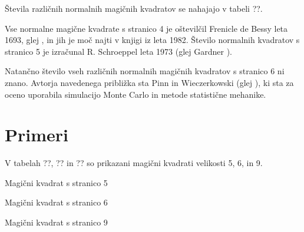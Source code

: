 \documentclass[a4paper,12pt]{article}
\begin{document}
Števila različnih normalnih magičnih kvadratov se nahajajo v tabeli ??.

Vse normalne magične kvadrate s stranico 4 je oštevilčil Frenicle de Bessy
leta 1693, glej \cite{bessy}, in jih je moč najti v knjigi \cite{berle}
iz leta 1982. Število normalnih kvadratov s stranico 5 je izračunal
R. Schroeppel leta 1973 (glej Gardner \cite{gard}).

Natančno število vseh različnih normalnih magičnih kvadratov s stranico 6 ni znano.
Avtorja navedenega približka sta Pinn in Wieczerkowski (glej \cite{pinn}), ki
sta za oceno uporabila simulacijo Monte Carlo in metode statistične mehanike.

\section{Primeri}


V tabelah ??, ?? in ?? so prikazani
magični kvadrati velikosti 5, 6, in 9.

Magični kvadrat s stranico 5

Magični kvadrat s stranico 6

Magični kvadrat s stranico 9
\end{document}
